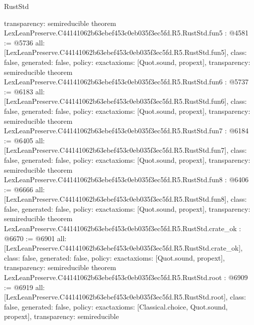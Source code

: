 \begin{lexlean}{RustStd}
\begin{coremodule}
{  transparency: semireducible
}
theorem LexLeanPreserve.C44141062b63ebef453c0eb035f3ec5fd.R5.RustStd.fun5 : @4581 := @5736 {
  all: [LexLeanPreserve.C44141062b63ebef453c0eb035f3ec5fd.R5.RustStd.fun5],
  class: false,
  generated: false,
  policy: exact{axioms: [Quot.sound, propext]},
  transparency: semireducible
}
theorem LexLeanPreserve.C44141062b63ebef453c0eb035f3ec5fd.R5.RustStd.fun6 : @5737 := @6183 {
  all: [LexLeanPreserve.C44141062b63ebef453c0eb035f3ec5fd.R5.RustStd.fun6],
  class: false,
  generated: false,
  policy: exact{axioms: [Quot.sound, propext]},
  transparency: semireducible
}
theorem LexLeanPreserve.C44141062b63ebef453c0eb035f3ec5fd.R5.RustStd.fun7 : @6184 := @6405 {
  all: [LexLeanPreserve.C44141062b63ebef453c0eb035f3ec5fd.R5.RustStd.fun7],
  class: false,
  generated: false,
  policy: exact{axioms: [Quot.sound, propext]},
  transparency: semireducible
}
theorem LexLeanPreserve.C44141062b63ebef453c0eb035f3ec5fd.R5.RustStd.fun8 : @6406 := @6666 {
  all: [LexLeanPreserve.C44141062b63ebef453c0eb035f3ec5fd.R5.RustStd.fun8],
  class: false,
  generated: false,
  policy: exact{axioms: [Quot.sound, propext]},
  transparency: semireducible
}
theorem LexLeanPreserve.C44141062b63ebef453c0eb035f3ec5fd.R5.RustStd.crate_ok : @6670 := @6901 {
  all: [LexLeanPreserve.C44141062b63ebef453c0eb035f3ec5fd.R5.RustStd.crate_ok],
  class: false,
  generated: false,
  policy: exact{axioms: [Quot.sound, propext]},
  transparency: semireducible
}
theorem LexLeanPreserve.C44141062b63ebef453c0eb035f3ec5fd.R5.RustStd.root : @6909 := @6919 {
  all: [LexLeanPreserve.C44141062b63ebef453c0eb035f3ec5fd.R5.RustStd.root],
  class: false,
  generated: false,
  policy: exact{axioms: [Classical.choice, Quot.sound, propext]},
  transparency: semireducible
}


\end{coremodule}
\end{lexlean}
